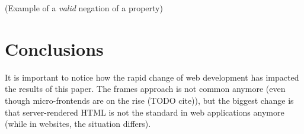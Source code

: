 \documentclass[a4paper,10pt]{article}
\theoremstyle{plain} %
\theoremstyle{definition}
\theoremstyle{remark}
\begin{document}
(Example of a \textit{valid} negation of a property)

\section{Conclusions}

It is important to notice how the rapid change of web development has impacted the results of this paper. The frames approach is not common anymore (even though micro-frontends are on the rise (TODO cite)), but the biggest change is that server-rendered HTML is not the standard in web applications anymore (while in websites, the situation differs).


\clearpage
\printbibliography
\end{document}
